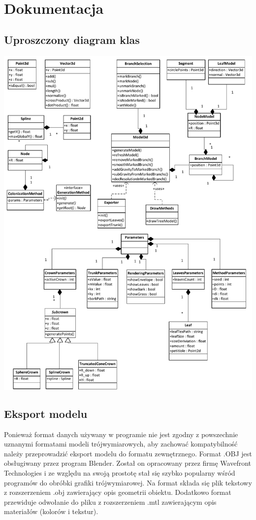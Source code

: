 \chapter{Dokumentacja}

\section{Uproszczony diagram klas}

\begin{center}
	\includegraphics[scale=0.55]{images/treemaker_uml}
	\label{treemaker_uml}
\end{center}

\section{Eksport modelu}
Ponieważ format danych używany w programie nie jest zgodny z powszechnie uznanymi formatami modeli trójwymiarowych, aby zachować kompatybilność należy przeprowadzić eksport modelu do 
formatu zewnętrznego. Format .OBJ jest obsługiwany przez program Blender.
Został on opracowany przez firmę Wavefront Technologies i ze względu na swoją prostotę stał się szybko
popularny wśród programów do obróbki grafiki trójwymiarowej. Na format składa się plik tekstowy z rozszerzeniem .obj 
zawierający opis geometrii obiektu. Dodatkowo format przewiduje odwołanie do pliku z rozszerzeniem .mtl zawierającym
opis materiałów (kolorów i tekstur).


